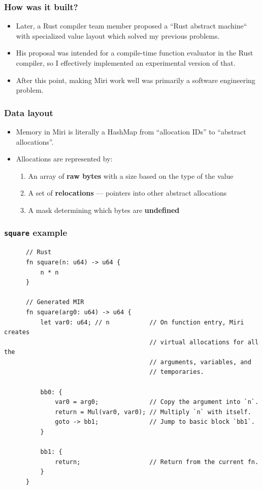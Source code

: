 \documentclass{beamer}
\begin{document}
\begin{frame}
  \frametitle{How was it built?}
  \begin{itemize}
    \item Later, a Rust compiler team member proposed a ``Rust abstract
      machine`` with specialized value layout which solved my previous problems.
      \pause

    \item His proposal was intended for a compile-time function evaluator in the
      Rust compiler, so I effectively implemented an experimental version of
      that. \pause

    \item After this point, making Miri work well was primarily a software
      engineering problem.
  \end{itemize}
\end{frame}

\begin{frame}
  \frametitle{Data layout}
  \begin{itemize}
    \item Memory in Miri is literally a HashMap from ``allocation IDs'' to
      ``abstract allocations''.

    \item Allocations are represented by: \pause
      \begin{enumerate}
        \item An array of \textbf{raw bytes} with a size based on the type of
          the value \pause
        \item A set of \textbf{relocations} --- pointers into other abstract
          allocations \pause
        \item A mask determining which bytes are \textbf{undefined}
      \end{enumerate}
  \end{itemize}
\end{frame}

\begin{frame}[fragile]
  \frametitle{\texttt{square} example}
  \begin{center}
    \begin{verbatim}
      // Rust
      fn square(n: u64) -> u64 {
          n * n
      }

      // Generated MIR
      fn square(arg0: u64) -> u64 {
          let var0: u64; // n           // On function entry, Miri creates
                                        // virtual allocations for all the
                                        // arguments, variables, and
                                        // temporaries.

          bb0: {
              var0 = arg0;              // Copy the argument into `n`.
              return = Mul(var0, var0); // Multiply `n` with itself.
              goto -> bb1;              // Jump to basic block `bb1`.
          }

          bb1: {
              return;                   // Return from the current fn.
          }
      }
    \end{verbatim}
  \end{center}
\end{frame}
\end{document}
